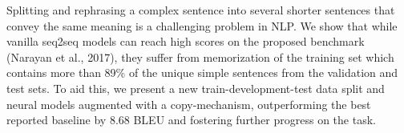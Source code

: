 Splitting and rephrasing a complex sentence into several shorter sentences that convey the same meaning is a challenging problem in NLP. We show that while vanilla seq2seq models can reach high scores on the proposed benchmark (Narayan et al., 2017), they suffer from memorization of the training set which contains more than 89\% of the unique simple sentences from the validation and test sets. To aid this, we present a new train-development-test data split and neural models augmented with a copy-mechanism, outperforming the best reported baseline by 8.68 BLEU and fostering further progress on the task.
